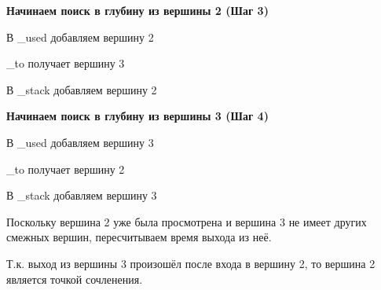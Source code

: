\documentclass[a4paper]{article}
\begin{document}
\textbf{Начинаем поиск в глубину из вершины 2 (Шаг 3)}
  \begin{figure}[!h]
  \end{figure}
\par
  В \_used добавляем вершину 2\par
  \_to получает вершину 3\par
  В \_stack добавляем вершину 2
\newpage

\textbf{Начинаем поиск в глубину из вершины 3 (Шаг 4)}
  \begin{figure}[!h]
  \end{figure}
\par
  В \_used добавляем вершину 3\par
  \_to получает вершину 2\par
  В \_stack добавляем вершину 3\par
  Поскольку вершина 2 уже была просмотрена и вершина 3 не имеет других смежных вершин, пересчитываем время выхода из неё.\par
  Т.к. выход из вершины 3 произошёл после входа в вершину 2, то вершина 2 является точкой сочленения.
\newpage
\end{document}
